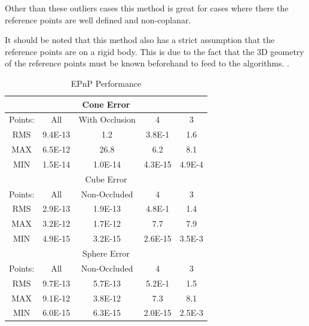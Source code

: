 \documentclass[journal]{IEEEtran}
\begin{document}
 Other than these outliers cases this method is great for cases where there the reference points are well defined and non-coplanar. 
 
 It should be noted that this method also has a strict assumption that the reference points are on a rigid body. This is due to the fact that the 3D geometry of the reference points must be known beforehand to feed to the algorithms. . 
 

\begin{table}[h]
	\caption{EPnP Performance}
	\label{EPnP_Table}
	\centering
	\begin{tabular}{|c|c|c|c|c|}
		
		\hline
		\multicolumn{5}{|c|}{Cone Error} \\
		\hline
		Points: & All & With Occlusion & 4 & 3\\
		\hline
		RMS & 9.4E-13  & 1.2 & 3.8E-1 & 1.6\\
		MAX & 6.5E-12 & 26.8 & 6.2 & 8.1\\
		MIN & 1.5E-14 & 1.0E-14 & 4.3E-15 & 4.9E-4\\
		\hline
		\multicolumn{5}{|c|}{Cube Error} \\
		\hline
		Points: & All & Non-Occluded & 4 & 3\\
		\hline
		RMS & 2.9E-13 & 1.9E-13 & 4.8E-1 & 1.4\\
		MAX & 3.2E-12 & 1.7E-12 & 7.7 & 7.9\\
		MIN & 4.9E-15 & 3.2E-15 & 2.6E-15 & 3.5E-3\\
		\hline
		\multicolumn{5}{|c|}{Sphere Error} \\
		\hline
		Points: & All & Non-Occluded & 4 & 3\\
		\hline
		RMS & 9.7E-13 & 5.7E-13 & 5.2E-1 & 1.5\\
		MAX & 9.1E-12 & 3.8E-12 & 7.3 & 8.1\\
		MIN & 6.0E-15 & 6.3E-15 & 2.0E-15 & 2.5E-3\\
		\hline
		
		
	\end{tabular}
\end{table}
\end{document}
